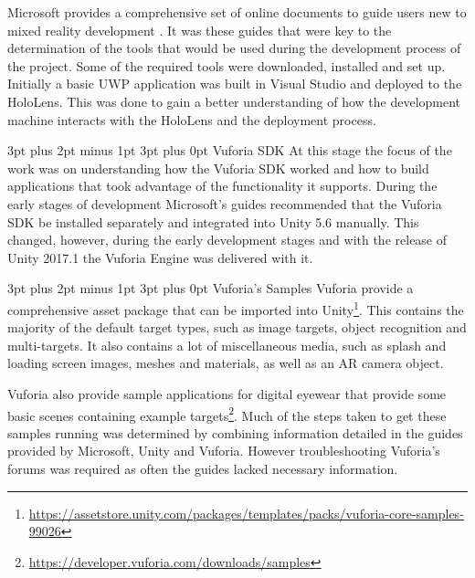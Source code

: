 \documentclass[12pt,a4paper,oneside]{article}
\makeatletter
\renewcommand\paragraph{\@startsection {paragraph}{1}{0mm} %
	                           {3pt plus 2pt minus 1pt} %
	                           {3pt plus 0pt} %
	                           {\normalfont}}
\renewcommand\subsubsection{\@startsection {subsubsection}{1}{0mm} %
	                           {3pt plus 2pt minus 1pt} %
	                           {3pt plus 0pt} %
	                           {\normalfont\bfseries}}
\makeatother
\begin{document}
Microsoft provides a comprehensive set of online documents to guide users new to mixed reality development \cite{hololensdev}. It was these guides that were key to the determination of the tools that would be used during the development process of the project. Some of the required tools were downloaded, installed and set up. Initially a basic UWP application was built in Visual Studio and deployed to the HoloLens. This was done to gain a better understanding of how the development machine interacts with the HoloLens and the deployment process.

\subsubsection{Vuforia SDK}
At this stage the focus of the work was on understanding how the Vuforia SDK worked and how to build applications that took advantage of the functionality it supports. During the early stages of development Microsoft's guides recommended that the Vuforia SDK be installed separately and integrated into Unity 5.6 manually. This changed, however, during the early development stages and with the release of Unity 2017.1 the Vuforia Engine was delivered with it.

\paragraph{Vuforia's Samples}
Vuforia provide a comprehensive asset package that can be imported into Unity\footnote{\url{https://assetstore.unity.com/packages/templates/packs/vuforia-core-samples-99026}}. This contains the majority of the default target types, such as image targets, object recognition and multi-targets. It also contains a lot of miscellaneous media, such as splash and loading screen images, meshes and materials,  as well as an AR camera object.

Vuforia also provide sample applications for digital eyewear that provide some basic scenes containing example targets\footnote{\url{https://developer.vuforia.com/downloads/samples}}. Much of the steps taken to get these samples running was determined by combining information detailed in the guides provided by Microsoft, Unity and Vuforia. However troubleshooting Vuforia's forums was required as often the guides lacked necessary information. 
\end{document}
